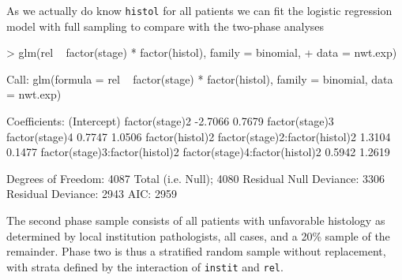 \documentclass{article}
\begin{document}
As we actually do know \texttt{histol} for all patients we can fit the logistic regression model with full sampling to compare with the two-phase analyses
\begin{Schunk}
\begin{Sinput}
> glm(rel ~ factor(stage) * factor(histol), family = binomial, 
+     data = nwt.exp)
\end{Sinput}
\begin{Soutput}
Call:  glm(formula = rel ~ factor(stage) * factor(histol), family = binomial,      data = nwt.exp) 

Coefficients:
                   (Intercept)                  factor(stage)2  
                       -2.7066                          0.7679  
                factor(stage)3                  factor(stage)4  
                        0.7747                          1.0506  
               factor(histol)2  factor(stage)2:factor(histol)2  
                        1.3104                          0.1477  
factor(stage)3:factor(histol)2  factor(stage)4:factor(histol)2  
                        0.5942                          1.2619  

Degrees of Freedom: 4087 Total (i.e. Null);  4080 Residual
Null Deviance:	    3306 
Residual Deviance: 2943 	AIC: 2959 
\end{Soutput}
\end{Schunk}

 The second phase sample consists of all patients with unfavorable
 histology as determined by local institution pathologists, all cases,
 and a 20\% sample of the remainder.  Phase two is thus a stratified
 random sample without replacement, with strata defined by the
 interaction of \texttt{instit} and \texttt{rel}.
\end{document}
